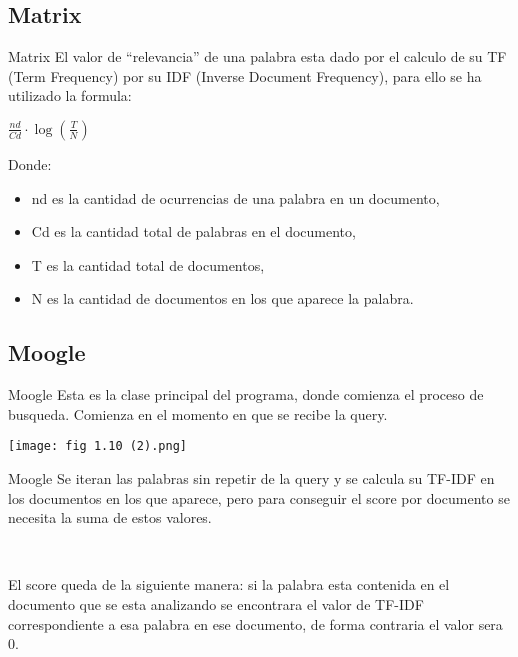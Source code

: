 \subsection{Matrix}
\begin{frame}{Matrix}
    El valor de “relevancia” de una palabra esta dado por el calculo de su TF (Term Frequency) por su IDF
(Inverse Document Frequency), para ello se ha utilizado la formula:

\begin{center}
	$\frac{nd}{Cd} \cdot \log (\frac{T}{N})$ \\
\end{center}

Donde:
\

\begin{itemize}
    \item nd es la cantidad de ocurrencias de una palabra en un documento,
\pause 
    \item Cd es la cantidad total de palabras en el documento,
\pause
    \item T es la cantidad total de documentos,
\pause
    \item N es la cantidad de documentos en los que aparece la palabra.
\end{itemize}
\end{frame}

\subsection{Moogle}
\begin{frame}{Moogle}
    Esta es la clase principal del programa, donde comienza el proceso de busqueda. Comienza en el momento
en que se recibe la query.

\pause

\begin{center}
	\texttt{[image: fig 1.10 (2).png]}\\
\end{center}
\end{frame}

\begin{frame}{Moogle}
    Se iteran las palabras sin repetir de la query y se calcula su TF-IDF en los
documentos en los que aparece, pero para conseguir el score por documento se necesita la suma de estos
valores.

\

El score queda de la siguiente manera: si la palabra esta contenida en el documento que se esta analizando se encontrara el valor de TF-IDF
correspondiente a esa palabra en ese documento, de forma contraria el valor sera 0.

\end{frame}